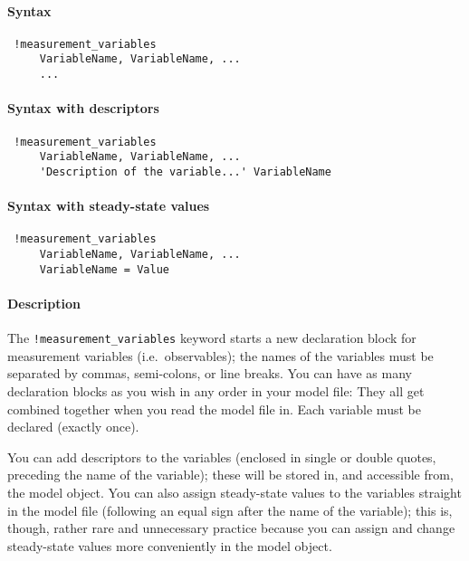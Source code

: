 


	\paragraph{Syntax}
 
 \begin{verbatim}
 !measurement_variables
     VariableName, VariableName, ...
     ...
 \end{verbatim}
 
 \paragraph{Syntax with descriptors}
 
 \begin{verbatim}
 !measurement_variables
     VariableName, VariableName, ...
     'Description of the variable...' VariableName
 \end{verbatim}
 
 \paragraph{Syntax with steady-state values}
 
 \begin{verbatim}
 !measurement_variables
     VariableName, VariableName, ...
     VariableName = Value
 \end{verbatim}
 
 \paragraph{Description}
 
 The \texttt{!measurement\_variables} keyword starts a new declaration
 block for measurement variables (i.e.~observables); the names of the
 variables must be separated by commas, semi-colons, or line breaks. You
 can have as many declaration blocks as you wish in any order in your
 model file: They all get combined together when you read the model file
 in. Each variable must be declared (exactly once).
 
 You can add descriptors to the variables (enclosed in single or double
 quotes, preceding the name of the variable); these will be stored in,
 and accessible from, the model object. You can also assign steady-state
 values to the variables straight in the model file (following an equal
 sign after the name of the variable); this is, though, rather rare and
 unnecessary practice because you can assign and change steady-state
 values more conveniently in the model object.
 
